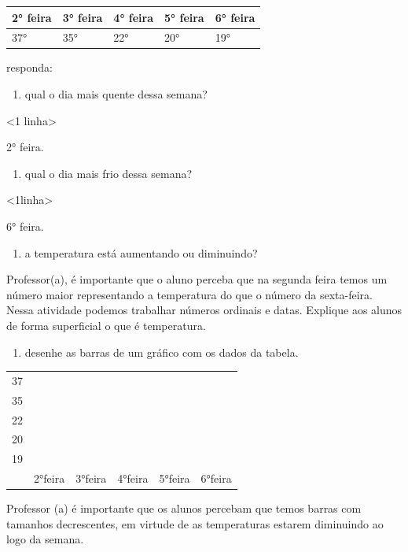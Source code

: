 \begin{longtable}[]{@{}lllll@{}}
\toprule
2° feira & 3° feira & 4° feira & 5° feira & 6° feira\tabularnewline
\midrule
\endhead
37° & 35° & 22° & 20° & 19°\tabularnewline
\bottomrule
\end{longtable}

responda:

\begin{enumerate}
\def\labelenumi{\Alph{enumi})}
\item
  qual o dia mais quente dessa semana?
\end{enumerate}

\textless{}1 linha\textgreater{}

2° feira.

\begin{enumerate}
\def\labelenumi{\Alph{enumi})}
\item
  qual o dia mais frio dessa semana?
\end{enumerate}

\textless{}1linha\textgreater{}

6° feira.

\begin{enumerate}
\def\labelenumi{\Alph{enumi})}
\item
  a temperatura está aumentando ou diminuindo?
\end{enumerate}

Professor(a), é importante que o aluno perceba que na segunda feira
temos um número maior representando a temperatura do que o número da
sexta-feira. Nessa atividade podemos trabalhar números ordinais e datas.
Explique aos alunos de forma superficial o que é temperatura.

\begin{enumerate}
\def\labelenumi{\Alph{enumi})}
\item
  desenhe as barras de um gráfico com os dados da tabela.
\end{enumerate}

\begin{longtable}[]{@{}llllll@{}}
\toprule
37 & & & & &\tabularnewline
35 & & & & &\tabularnewline
22 & & & & &\tabularnewline
20 & & & & &\tabularnewline
19 & & & & &\tabularnewline
& 2°feira & 3°feira & 4°feira & 5°feira & 6°feira\tabularnewline
\bottomrule
\end{longtable}

Professor (a) é importante que os alunos percebam que temos barras com
tamanhos decrescentes, em virtude de as temperaturas estarem diminuindo
ao logo da semana.

